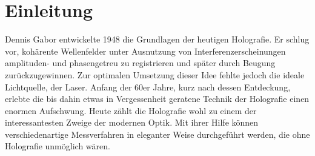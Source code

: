 \chapter{Einleitung}
Dennis Gabor entwickelte 1948 die Grundlagen der heutigen Holografie. 
Er schlug vor, kohärente Wellenfelder unter Ausnutzung von Interferenzerscheinungen amplituden- und phasengetreu zu registrieren und später durch Beugung zurückzugewinnen. 
Zur optimalen Umsetzung dieser Idee fehlte jedoch die ideale Lichtquelle, der Laser. 
Anfang der 60er Jahre, kurz nach dessen Entdeckung, erlebte die bis dahin etwas in Vergessenheit geratene Technik der Holografie einen enormen Aufschwung. 
Heute zählt die Holografie wohl zu einem der interessantesten Zweige der modernen Optik. 
Mit ihrer Hilfe können verschiedenartige Messverfahren in eleganter Weise durchgeführt werden, die ohne Holografie unmöglich wären.